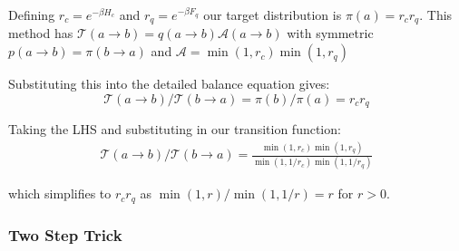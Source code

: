 \begin{Shaded}
\begin{Highlighting}[]
\OperatorTok{=}

 
\OperatorTok{=}

\OperatorTok{=}
  \NormalTok{,}\NormalTok{) }\OperatorTok{\textless{}}\OperatorTok{{-}}\OperatorTok{*}
\OperatorTok{=}
    \NormalTok{,}\NormalTok{) }\OperatorTok{\textless{}}\OperatorTok{{-}}\OperatorTok{*}
\OperatorTok{=}

\OperatorTok{=}
\end{Highlighting}
\end{Shaded}

Defining \(r_c = e^{-\beta H_c}\) and \(r_q = e^{-\beta F_q}\) our target distribution is \(\pi(a) = r_c r_q\). This method has \(\mathcal{T}(a\to b) = q(a\to b)\mathcal{A}(a \to b)\) with symmetric \(p(a \to b) = \pi(b \to a)\) and \(\mathcal{A} = \min\left(1, r_c\right) \min\left(1, r_q\right)\)

Substituting this into the detailed balance equation gives: \[\mathcal{T}(a \to b)/\mathcal{T}(b \to a) = \pi(b)/\pi(a) = r_c r_q\]

Taking the LHS and substituting in our transition function: \[\begin{aligned}
\mathcal{T}(a \to b)/\mathcal{T}(b \to a) = \frac{\min\left(1, r_c\right) \min\left(1, r_q\right)}{ \min\left(1, 1/r_c\right) \min\left(1, 1/r_q\right)}\end{aligned}\]

which simplifies to \(r_c r_q\) as \(\min(1,r)/\min(1,1/r) = r\) for \(r > 0\).

\hypertarget{two-step-trick-1}{%
\subsubsection{Two Step Trick}\label{two-step-trick-1}}

